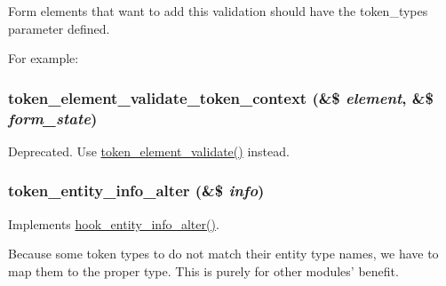 Form elements that want to add this validation should have the token\_\-types parameter defined.

For example: 
 \hypertarget{token_8module_abbe1ab0d6a3c879dd953427f7d0a4f8e}{
\subsubsection[{token\_\-element\_\-validate\_\-token\_\-context}]{\setlength{\rightskip}{0pt plus 5cm}token\_\-element\_\-validate\_\-token\_\-context (\&\$ {\em element}, \/  \&\$ {\em form\_\-state})}}
\label{token_8module_abbe1ab0d6a3c879dd953427f7d0a4f8e}
Deprecated. Use \hyperlink{token_8module_acaac5d083e5f83323e9e2914223a729e}{token\_\-element\_\-validate()} instead. \hypertarget{token_8module_a9015db039cba923ed4bb1167faa8a4a8}{
\subsubsection[{token\_\-entity\_\-info\_\-alter}]{\setlength{\rightskip}{0pt plus 5cm}token\_\-entity\_\-info\_\-alter (\&\$ {\em info})}}
\label{token_8module_a9015db039cba923ed4bb1167faa8a4a8}
Implements \hyperlink{group__hooks_ga0394a72e4872603e91ce22440195ab45}{hook\_\-entity\_\-info\_\-alter()}.

Because some token types to do not match their entity type names, we have to map them to the proper type. This is purely for other modules' benefit.

